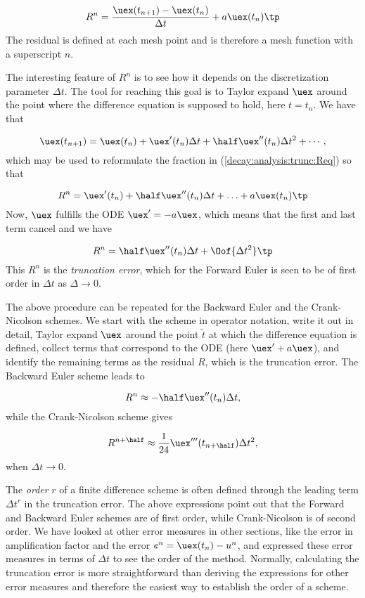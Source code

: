 \documentclass[graybox,sectrefs,envcountresetchap,open=right,final]{svmonodo}
\begin{document}
\begin{equation}
R^n = \frac{\uex(t_{n+1})-\uex(t_n)}{\Delta t} + a\uex(t_n)
\tp
\label{decay:analysis:trunc:Req}
\end{equation}
The residual is defined at each mesh point and is therefore a mesh
function with a superscript $n$.

The interesting feature of $R^n$ is to see how it
depends on the discretization parameter $\Delta t$.
The tool for reaching
this goal is to Taylor expand $\uex$ around the point where the
difference equation is supposed to hold, here $t=t_n$.
We have that

\[ \uex(t_{n+1}) = \uex(t_n) + \uex'(t_n)\Delta t + \half\uex''(t_n)
\Delta t^2 + \cdots, \]
which may be used to reformulate the fraction in
(\ref{decay:analysis:trunc:Req}) so that

\[ R^n = \uex'(t_n) + \half\uex''(t_n)\Delta t + \ldots + a\uex(t_n)\tp\]
Now, $\uex$ fulfills the ODE $\uex'=-a\uex$, which means that the first and last
term cancel and we have

\[ R^n = \half\uex''(t_n)\Delta t + \Oof{\Delta t^2}\tp \]
This $R^n$ is the \emph{truncation error}, which for the Forward Euler is seen
to be of first order in $\Delta t$ as $\Delta \rightarrow 0$.

The above procedure can be repeated for the Backward Euler and the
Crank-Nicolson schemes. We start with the scheme in operator notation,
write it out in detail, Taylor expand $\uex$ around the point $\tilde t$
at which the difference equation is defined, collect terms that
correspond to the ODE (here $\uex' + a\uex$), and identify the remaining
terms as the residual $R$, which is the truncation error.
The Backward Euler scheme leads to

\[ R^n \approx -\half\uex''(t_n)\Delta t, \]
while the Crank-Nicolson scheme gives

\[ R^{n+\half} \approx \frac{1}{24}\uex'''(t_{n+\half})\Delta t^2,\]
when $\Delta t\rightarrow 0$.

The \emph{order} $r$ of a finite difference scheme is often defined through
the leading term $\Delta t^r$ in the truncation error. The above
expressions point out that the Forward and Backward Euler schemes are
of first order, while Crank-Nicolson is of second order.  We have
looked at other error measures in other sections, like the error in
amplification factor and the error $e^n=\uex(t_n)-u^n$, and expressed
these error measures in terms of $\Delta t$ to see the order of the
method. Normally, calculating the truncation error is more
straightforward than deriving the expressions for other error measures
and therefore the easiest way to establish the order of a scheme.
\end{document}
